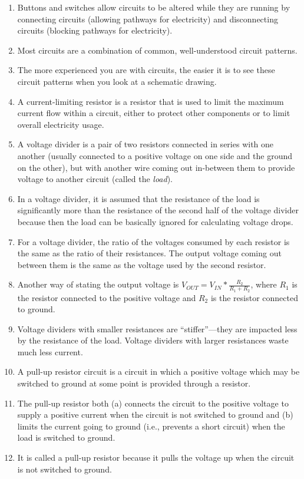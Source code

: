 \begin{enumerate}
\item Buttons and switches allow circuits to be altered while they are running by connecting circuits (allowing pathways for electricity) and disconnecting circuits (blocking pathways for electricity).
\item Most circuits are a combination of common, well-understood circuit patterns.
\item The more experienced you are with circuits, the easier it is to see these circuit patterns when you look at a schematic drawing.
\item A current-limiting resistor is a resistor that is used to limit the maximum current flow within a circuit, either to protect other components or to limit overall electricity usage.
\item A voltage divider is a pair of two resistors connected in series with one another (usually connected to a positive voltage on one side and the ground on the other), but with another wire coming out in-between them to provide voltage to another circuit (called the \emph{load}).
\item In a voltage divider, it is assumed that the resistance of the load is significantly more than the resistance of the second half of the voltage divider because then the load can be basically ignored for calculating voltage drops.
\item For a voltage divider, the ratio of the voltages consumed by each resistor is the same as the ratio of their resistances.  The output voltage coming out between them is the same as the voltage used by the second resistor.
\item Another way of stating the output voltage is $V_{OUT} = V_{IN} * \frac{R_2}{R_1 + R_2}$, where $R_1$ is the resistor connected to the positive voltage and $R_2$ is the resistor connected to ground.
\item Voltage dividers with smaller resistances are ``stiffer''---they are impacted less by the resistance of the load.  Voltage dividers with larger resistances waste much less current.
\item A pull-up resistor circuit is a circuit in which a positive voltage which may be switched to ground at some point is provided through a resistor.
\item The pull-up resistor both (a) connects the circuit to the positive voltage to supply a positive current when the circuit is not switched to ground and (b) limits the current going to ground (i.e., prevents a short circuit) when the load is switched to ground.
\item It is called a pull-up resistor because it pulls the voltage up when the circuit is not switched to ground.
\end{enumerate}

